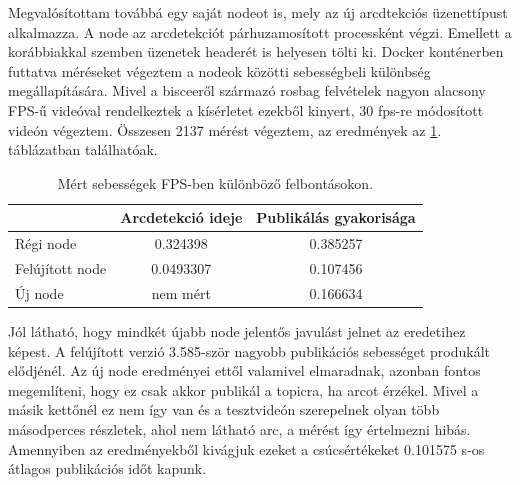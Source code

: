 Megvalósítottam továbbá egy saját nodeot is, mely az új arcdtekciós üzenettípust alkalmazza. A node az arcdetekciót párhuzamosított processként végzi. Emellett a korábbiakkal szemben üzenetek headerét is helyesen tölti ki. Docker konténerben futtatva méréseket végeztem a nodeok közötti sebességbeli különbség megállapítására. Mivel a bisceeről származó rosbag felvételek nagyon alacsony FPS-ű videóval rendelkeztek a kísérletet ezekből kinyert, 30 fps-re módosított videón végeztem. Összesen 2137 mérést végeztem, az eredmények az \ref{tab:node_speed_results}. táblázatban találhatóak.
\begin{table}[h]
    \footnotesize
    \centering
    \renewcommand{\arraystretch}{1.5}
    \begin{tabular} {|l | c | c |}
        \hline
         & Arcdetekció ideje & Publikálás gyakorisága \\
        \hline
        Régi node & 0.324398 & 0.385257 \\
        Felújított node & 0.0493307 & 0.107456 \\
        Új node & nem mért & 0.166634 \\
        \hline
    \end{tabular}
    \caption{Mért sebességek FPS-ben különböző felbontásokon.}
    \label{tab:node_speed_results}
\end{table}

Jól látható, hogy mindkét újabb node jelentős javulást jelnet az eredetihez képest. A felújított verzió 3.585-ször nagyobb publikációs sebességet produkált elődjénél. Az új node eredményei ettől valamivel elmaradnak, azonban fontos megemlíteni, hogy ez csak akkor publikál a topicra, ha arcot érzékel. Mivel a másik kettőnél ez nem így van és a tesztvideón szerepelnek olyan több másodperces részletek, ahol nem látható arc, a mérést így értelmezni hibás. Amennyiben az eredményekből kivágjuk ezeket a csúcsértékeket 0.101575 s-os átlagos publikációs időt kapunk.